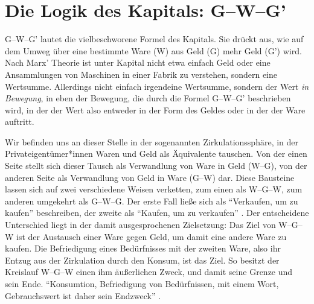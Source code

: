 \documentclass[12pt,
               paper=a4,
               twoside=false,
               onehalfspacing,
               bibliography=totoc,
               toc=graduated,
               ]{scrartcl}
\newcommand{\pc}[2]{\parencite[#1]{#2}}
\newcommand{\vgl}[2]{\parencite[vgl.][#1]{#2}}
\newcommand{\gwg}{G--W--G'\xspace}
\newcommand{\wgw}{W--G--W\xspace}
\begin{document}

\section{Die Logik des Kapitals: \gwg}
\label{gwg}

\gwg lautet die vielbeschworene Formel des Kapitals. Sie drückt aus,
wie auf dem Umweg über eine bestimmte Ware (W) aus Geld (G) mehr Geld
(G') wird. Nach Marx' Theorie ist unter Kapital nicht etwa einfach
Geld oder eine Ansammlungen von Maschinen in einer Fabrik zu
verstehen, sondern eine Wertsumme. Allerdings nicht einfach irgendeine
Wertsumme, sondern der Wert \emph{in Bewegung}, in eben der Bewegung,
die durch die Formel \gwg beschrieben wird, in der der Wert also
entweder in der Form des Geldes oder in der der Ware auftritt.



Wir befinden uns an dieser Stelle in der sogenannten
Zirkulationssphäre, in der Privateigentümer*innen Waren und Geld als
Äquivalente tauschen. Von der einen Seite stellt sich dieser Tausch
als Verwandlung von Ware in Geld (W--G), von der anderen Seite als
Verwandlung von Geld in Ware (G--W) dar. Diese Bausteine lassen sich
auf zwei verschiedene Weisen verketten, zum einen als \wgw, zum
anderen umgekehrt als G--W--G. Der erste Fall ließe sich als
"`Verkaufen, um zu kaufen"' beschreiben, der zweite als "`Kaufen, um
zu verkaufen"' \vgl{162}{kap}. Der entscheidene Unterschied liegt in
der damit ausgesprochenen Zielsetzung: Das Ziel von \wgw ist der
Austausch einer Ware gegen Geld, um damit eine andere Ware zu kaufen.
Die Befriedigung eines Bedürfnisses mit der zweiten Ware, also ihr
Entzug aus der Zirkulation durch den Konsum, ist das Ziel. So besitzt
der Kreislauf \wgw einen ihm äußerlichen Zweck, und damit seine Grenze
und sein Ende. "`Konsumtion, Befriedigung von Bedürfnissen, mit einem
Wort, Gebrauchswert ist daher sein Endzweck"' \pc{164}{kap}.

\end{document}
